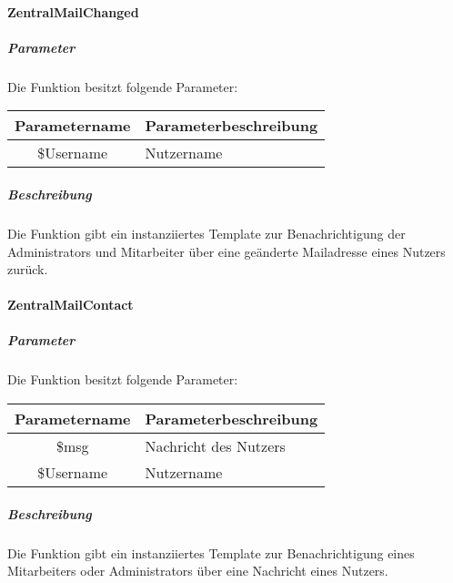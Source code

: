 \paragraph{ZentralMailChanged}
\subparagraph{Parameter} Die Funktion besitzt folgende Parameter:
\begin{table}[H]
	\begin{tabular}{|c|p{11cm}|}
		\hline
		\textbf{Parametername} & \textbf{Parameterbeschreibung} \\ \hline
		\$Username & Nutzername \\ \hline
	\end{tabular}
\end{table}
\subparagraph{Beschreibung} Die Funktion gibt ein instanziiertes Template zur Benachrichtigung der Administrators und Mitarbeiter über eine geänderte Mailadresse eines Nutzers zurück.
\paragraph{ZentralMailContact}
\subparagraph{Parameter} Die Funktion besitzt folgende Parameter:
\begin{table}[H]
	\begin{tabular}{|c|p{11cm}|}
		\hline
		\textbf{Parametername} & \textbf{Parameterbeschreibung} \\ \hline
		\$msg      & Nachricht des Nutzers \\ \hline
		\$Username & Nutzername \\ \hline
	\end{tabular}
\end{table}
\subparagraph{Beschreibung} Die Funktion gibt ein instanziiertes Template zur Benachrichtigung eines Mitarbeiters oder Administrators über eine Nachricht eines Nutzers.